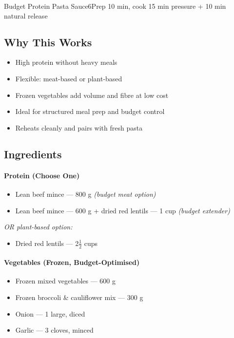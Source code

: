 \begin{recipebox}{Budget Protein Pasta Sauce}{6}{Prep 10 min, cook 15 min pressure + 10 min natural release}
\subsection*{Why This Works}
\begin{itemize}
    \item High protein without heavy meals
    \item Flexible: meat-based or plant-based
    \item Frozen vegetables add volume and fibre at low cost
    \item Ideal for structured meal prep and budget control
    \item Reheats cleanly and pairs with fresh pasta
\end{itemize}

\subsection*{Ingredients}

\paragraph{Protein (Choose One)}
\begin{itemize}
    \item Lean beef mince — 800 g \emph{(budget meat option)}
    \item Lean beef mince — 600 g + dried red lentils — 1 cup \emph{(budget extender)}
\end{itemize}

\textit{OR plant-based option:}

\begin{itemize}
    \item Dried red lentils — 2$\tfrac{1}{2}$ cups
\end{itemize}

\paragraph{Vegetables (Frozen, Budget-Optimised)}
\begin{itemize}
    \item Frozen mixed vegetables — 600 g
    \item Frozen broccoli \& cauliflower mix — 300 g
    \item Onion — 1 large, diced
    \item Garlic — 3 cloves, minced
\end{itemize}


\end{recipebox}
